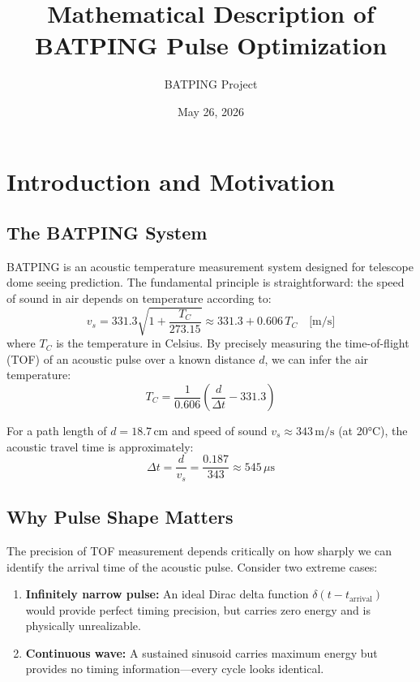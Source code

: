 \documentclass[11pt]{article}
\title{Mathematical Description of BATPING Pulse Optimization}
\author{BATPING Project}
\date{May 26, 2026}
\begin{document}
\maketitle

\tableofcontents
\newpage

\section{Introduction and Motivation}

\subsection{The BATPING System}

BATPING is an acoustic temperature measurement system designed for telescope dome seeing prediction. The fundamental principle is straightforward: the speed of sound in air depends on temperature according to:
\begin{equation}
    v_s = 331.3 \sqrt{1 + \frac{T_C}{273.15}} \approx 331.3 + 0.606 \, T_C \quad \text{[m/s]}
\end{equation}
where $T_C$ is the temperature in Celsius. By precisely measuring the time-of-flight (TOF) of an acoustic pulse over a known distance $d$, we can infer the air temperature:
\begin{equation}
    T_C = \frac{1}{0.606}\left(\frac{d}{\Delta t} - 331.3\right)
\end{equation}

For a path length of $d = 18.7\,\text{cm}$ and speed of sound $v_s \approx 343\,\text{m/s}$ (at 20°C), the acoustic travel time is approximately:
\begin{equation}
    \Delta t = \frac{d}{v_s} = \frac{0.187}{343} \approx 545\,\mu\text{s}
\end{equation}

\subsection{Why Pulse Shape Matters}

The precision of TOF measurement depends critically on how sharply we can identify the arrival time of the acoustic pulse. Consider two extreme cases:

\begin{enumerate}
    \item \textbf{Infinitely narrow pulse:} An ideal Dirac delta function $\delta(t - t_{\text{arrival}})$ would provide perfect timing precision, but carries zero energy and is physically unrealizable.

    \item \textbf{Continuous wave:} A sustained sinusoid carries maximum energy but provides no timing information---every cycle looks identical.
\end{enumerate}
\end{document}
